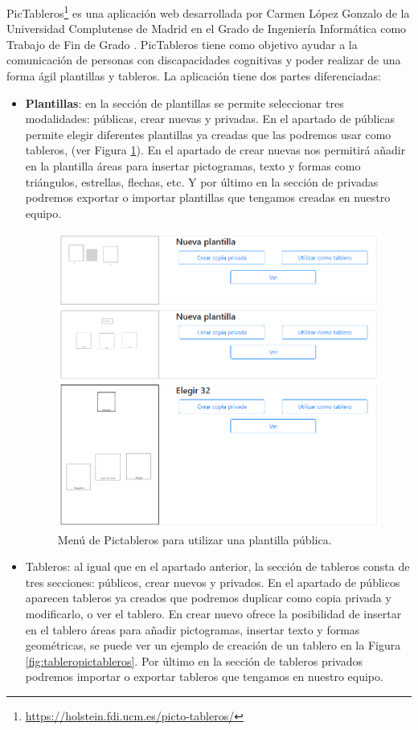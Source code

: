 PicTableros\footnote{\url{https://holstein.fdi.ucm.es/picto-tableros/}} es una aplicación web desarrollada por Carmen López Gonzalo de la Universidad Complutense de Madrid en el Grado de Ingeniería Informática como Trabajo de Fin de Grado \citep{TFGPicTableros}. PicTableros tiene como objetivo ayudar a la comunicación de personas con discapacidades cognitivas y poder realizar de una forma ágil plantillas y tableros. 
La aplicación tiene dos partes diferenciadas:
\begin{itemize}
	\item \textbf{Plantillas}: en la sección de plantillas se permite seleccionar tres modalidades: públicas, crear nuevas y privadas. En el apartado de públicas permite elegir diferentes plantillas ya creadas que las podremos usar como tableros, (ver Figura \ref{fig:pictablerosplantilla}). 
	En el apartado de crear nuevas nos permitirá añadir en la plantilla áreas para insertar pictogramas, texto y formas como triángulos, estrellas, flechas, etc. Y por último en la sección  de privadas podremos exportar o importar plantillas que tengamos creadas en nuestro equipo.
	
	\begin{figure}[h!]
		\centering
		\includegraphics[width=0.7\linewidth]{Imagenes/Bitmap/PictablerosPlantilla}
		\caption{Menú de Pictableros para utilizar una plantilla pública.}
		\label{fig:pictablerosplantilla}
	\end{figure}
	
	
	\item Tableros: al igual que en el apartado anterior, la sección de tableros consta de tres secciones: públicos, crear nuevos y privados. En el apartado de públicos aparecen tableros ya creados que podremos duplicar como copia privada y modificarlo, o ver el tablero. En crear nuevo ofrece la posibilidad de insertar en el tablero áreas para añadir pictogramas, insertar texto y formas geométricas, se puede ver un ejemplo de creación de un tablero en la Figura \ref{fig:tableropictableros}. Por último en la sección de tableros privados podremos importar o exportar tableros que tengamos en nuestro equipo.
	

\end{itemize}
